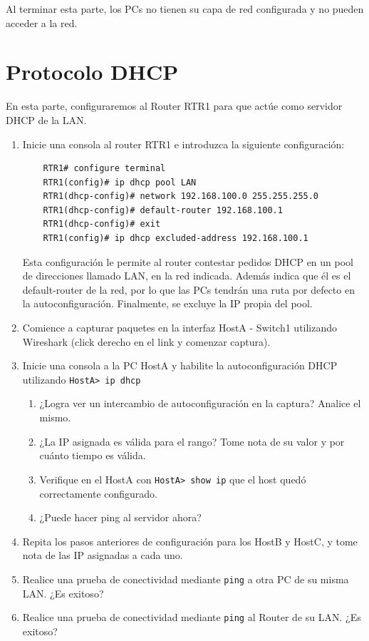 \documentclass[a4paper,10pt]{article}
\begin{document}
Al terminar esta parte, los PCs no tienen su capa de red configurada y no pueden acceder a la red.

\section{Protocolo DHCP}

En esta parte, configuraremos al Router RTR1 para que actúe como servidor DHCP de la LAN.

\begin{enumerate}
    \item Inicie una consola al router RTR1 e introduzca la siguiente configuración:
    \begin{verbatim}
    RTR1# configure terminal
    RTR1(config)# ip dhcp pool LAN
    RTR1(dhcp-config)# network 192.168.100.0 255.255.255.0
    RTR1(dhcp-config)# default-router 192.168.100.1
    RTR1(dhcp-config)# exit
    RTR1(config)# ip dhcp excluded-address 192.168.100.1
    \end{verbatim}

    Esta configuración le permite al router contestar pedidos DHCP en un pool de direcciones llamado LAN, en la red indicada. Además indica que él es el default-router de la red, por lo que las PCs tendrán una ruta por defecto en la autoconfiguración. Finalmente, se excluye la IP propia del pool.

    \item Comience a capturar paquetes en la interfaz HostA - Switch1 utilizando Wireshark (click derecho en el link y comenzar captura).
    \item Inicie una consola a la PC HostA y habilite la autoconfiguración DHCP utilizando \texttt{HostA> ip dhcp}
    \begin{enumerate}
     \item ¿Logra ver un intercambio de autoconfiguración en la captura? Analice el mismo.
     \item ¿La IP asignada es válida para el rango? Tome nota de su valor y por cuánto tiempo es válida.
     \item Verifique en el HostA con \texttt{HostA> show ip} que el host quedó correctamente configurado.
     \item ¿Puede hacer ping al servidor ahora?
    \end{enumerate}

    \item Repita los pasos anteriores de configuración para los HostB y HostC, y tome nota de las IP asignadas a cada uno.
    \item Realice una prueba de conectividad mediante \texttt{ping} a otra PC de su misma LAN. ¿Es exitoso?
    \item Realice una prueba de conectividad mediante \texttt{ping} al Router de su LAN. ¿Es exitoso?
\end{enumerate}
\end{document}
